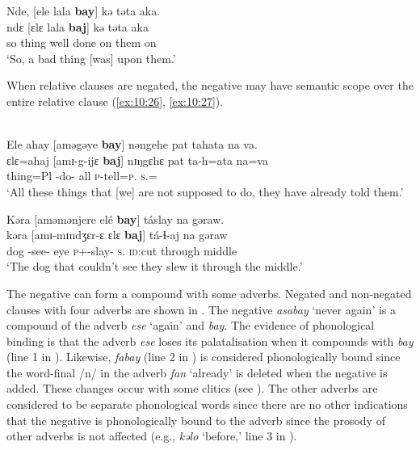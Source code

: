 \ea \label{ex:10:25}
Nde,  [ele  lala  \textbf{bay}]  kə  təta  aka.\\
\gll  ndɛ     [ɛlɛ   lala    \textbf{baj}]   kə   təta   aka\\
      so    thing  {well done}  {\NEG}  on  them  on\\
\glt  ‘So, a bad thing [was] upon them.’ 
\z

When relative clauses are negated, the negative may have semantic scope over the entire relative clause (\ref{ex:10:26}, \ref{ex:10:27}). 

\ea \label{ex:10:26}\\
Ele  ahay  [aməgəye  \textbf{bay}]  nəngehe  pat  tahata  na  va.\\
\gll  ɛlɛ=ahaj  [amɪ-g-ijɛ   \textbf{baj}]  nɪŋgɛhɛ  pat  ta-h=ata  na=va\\
      thing=Pl  {\DEP}-do-{\CL}  {\NEG}  {\DEM}  all  \textsc{p}-tell=\textsc{p}.{\IO}  \textsc{s}.{\DO}={\PRF}\\
\glt  ‘All these things that [we] are not supposed to do, they have already told them.’  
\z

\ea \label{ex:10:27}
Kəra  [aməmənjere  elé  \textbf{bay}]  táslay  na  gəraw.\\
\gll  kəra    [amɪ-mɪndʒɛr-ɛ  ɛlɛ  \textbf{baj}]  tá-ɬ{}-aj    na  gəraw\\
      dog    {\DEP}-see-{\CL}  eye  {\NEG}  \textsc{p}+{\IFV}-slay{}-{\CL}    \textsc{s}.{\DO}  {\textsc{id}:cut through middle}\\
\glt  ‘The dog that couldn’t see they slew it through the middle.’
\z

The negative can form a compound with some adverbs. Negated and non-negated clauses with four adverbs are shown in . The negative \textit{asabay} ‘never again’ is a compound of  the adverb \textit{ese} ‘again’ and \textit{bay}. The evidence of phonological binding is that the adverb \textit{ese}  loses its palatalisation when it compounds with \textit{bay} (line 1 in ). Likewise, \textit{fabay} (line 2 in ) is considered phonologically bound since the word-final /n/ in the adverb \textit{fan} ‘already’ is deleted when the negative is added. These changes occur with some clitics (see ). The other adverbs are considered to be separate phonological words since there are no other indications that the negative is phonologically bound to the adverb since the prosody of other adverbs is not affected (e.g., \textit{kəlo} ‘before,’ line 3 in ).  

